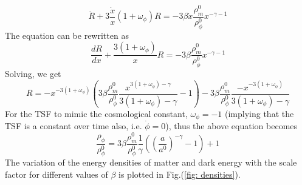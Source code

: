 \documentclass[preprint,aps,floatfix]{revtex4}
\begin{document}
    \begin{equation}
        \dot{R} + 3\frac{\dot{x}}{x} (1+\omega_\phi)R = -3\beta \dot{x}\frac{\rho_m^0}{\rho_\phi^0}x^{-\gamma-1}
    \end{equation}
    The equation can be rewritten as
    \begin{equation}
        \frac{dR}{dx} + \frac{3(1+\omega_\phi)}{x}R = -3\beta \frac{\rho_m^0}{\rho_\phi^0} x^{-\gamma-1}
    \end{equation}
    Solving, we get
    \begin{equation}
            R = -x^{-3(1+\omega_\phi)}\left( 3\beta \frac{\rho_m^0}{\rho_\phi^0}\frac{x^{3(1+\omega_\phi)-\gamma}}{3(1+\omega_\phi)-\gamma} - 1 \right) - 3\beta \frac{\rho_m^0}{\rho_\phi^0}\frac{-x^{-3(1+\omega_\phi)}}{3(1+\omega_\phi)-\gamma}
    \end{equation}
    For the TSF to mimic the cosmological constant, $\omega_\phi = -1$ (implying that the TSF is a constant over time also, i.e. $\dot{\phi} = 0$), thus the above equation becomes
    \begin{equation}\label{eq:DensityEvolutionField}
        \frac{\rho_\phi}{\rho_\phi^0} = 3\beta \frac{\rho_m^0}{\rho_\phi^0}\frac{1}{\gamma}\left( \left( \frac{a}{a^0} \right)^{-\gamma} - 1\right) + 1
    \end{equation}
    The variation of the energy densities of matter and dark energy with the scale factor for different values of $\beta$ is plotted in Fig.(\ref{fig: densities}).
%
\end{document}

